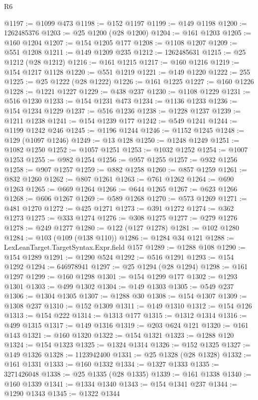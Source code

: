 \begin{lexlean}{R6}
\begin{coremodule}
@1197 := @1099 @473
@1198 := @152 @1197
@1199 := @149 @1198
@1200 := 1262485376
@1203 := @25 @1200 (@28 @1200)
@1204 := @161 @1203
@1205 := @160 @1204
@1207 := @154 @1205 @177
@1208 := @1108 @1207
@1209 := @551 @1208
@1211 := @149 @1209 @235
@1212 := 1262485631
@1215 := @25 @1212 (@28 @1212)
@1216 := @161 @1215
@1217 := @160 @1216
@1219 := @154 @1217 @1128
@1220 := @551 @1219
@1221 := @149 @1220
@1222 := 255
@1225 := @25 @1222 (@28 @1222)
@1226 := @161 @1225
@1227 := @160 @1226
@1228 := @1221 @1227
@1229 := @438 @237
@1230 := @1108 @1229
@1231 := @516 @1230
@1233 := @154 @1231 @473
@1234 := @1136 @1233
@1236 := @154 @1234 @1229
@1237 := @516 @1236
@1238 := @1228 @1237
@1239 := @1211 @1238
@1241 := @154 @1239 @177
@1242 := @549 @1241
@1244 := @1199 @1242 @246
@1245 := @1196 @1244
@1246 := @1152 @1245
@1248 := @129 (@1097 @1246)
@1249 := @13 @128
@1250 := @1248 @1249
@1251 := @1082 @1250
@1252 := @1057 @1251
@1253 := @1032 @1252
@1254 := @1007 @1253
@1255 := @982 @1254
@1256 := @957 @1255
@1257 := @932 @1256
@1258 := @907 @1257
@1259 := @882 @1258
@1260 := @857 @1259
@1261 := @832 @1260
@1262 := @807 @1261
@1263 := @761 @1262
@1264 := @690 @1263
@1265 := @669 @1264
@1266 := @644 @1265
@1267 := @623 @1266
@1268 := @606 @1267
@1269 := @589 @1268
@1270 := @573 @1269
@1271 := @481 @1270
@1272 := @425 @1271
@1273 := @391 @1272
@1274 := @362 @1273
@1275 := @333 @1274
@1276 := @308 @1275
@1277 := @279 @1276
@1278 := @249 @1277
@1280 := @122 (@127 @1278)
@1281 := @102 @1280
@1284 := @103 (@109 (@138 @110))
@1286 := @1284 @34 @121
@1288 := LexLeanTarget.TargetSyntax.Expr.field @157
@1289 := @1288 @108
@1290 := @154 @1289
@1291 := @1290 @524
@1292 := @516 @1291
@1293 := @154 @1292
@1294 := 646978941
@1297 := @25 @1294 (@28 @1294)
@1298 := @161 @1297
@1299 := @160 @1298
@1301 := @154 @1299 @177
@1302 := @1293 @1301
@1303 := @499 @1302
@1304 := @149 @1303
@1305 := @549 @237
@1306 := @1304 @1305
@1307 := @1288 @30
@1308 := @154 @1307
@1309 := @1308 @237
@1310 := @152 @1309
@1311 := @149 @1310
@1312 := @154 @126
@1313 := @154 @222
@1314 := @1313 @177
@1315 := @1312 @1314
@1316 := @499 @1315
@1317 := @149 @1316
@1319 := @203 @624 @121
@1320 := @161 @143
@1321 := @160 @1320
@1322 := @154 @1321
@1323 := @1288 @120
@1324 := @154 @1323
@1325 := @1324 @1314
@1326 := @152 @1325
@1327 := @149 @1326
@1328 := 1123942400
@1331 := @25 @1328 (@28 @1328)
@1332 := @161 @1331
@1333 := @160 @1332
@1334 := @1327 @1333
@1335 := 3271426048
@1338 := @25 @1335 (@28 @1335)
@1339 := @161 @1338
@1340 := @160 @1339
@1341 := @1334 @1340
@1343 := @154 @1341 @237
@1344 := @1290 @1343
@1345 := @1322 @1344

\end{coremodule}
\end{lexlean}
